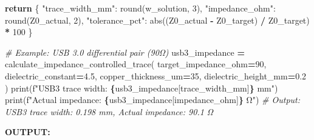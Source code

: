 \documentclass[
]{article}
\newenvironment{Shaded}{\begin{snugshade}}{\end{snugshade}}
\newcommand{\BuiltInTok}[1]{#1}
\newcommand{\CommentTok}[1]{\textcolor[rgb]{0.56,0.35,0.01}{\textit{#1}}}
\newcommand{\ControlFlowTok}[1]{\textcolor[rgb]{0.13,0.29,0.53}{\textbf{#1}}}
\newcommand{\DecValTok}[1]{\textcolor[rgb]{0.00,0.00,0.81}{#1}}
\newcommand{\FloatTok}[1]{\textcolor[rgb]{0.00,0.00,0.81}{#1}}
\newcommand{\NormalTok}[1]{#1}
\newcommand{\OperatorTok}[1]{\textcolor[rgb]{0.81,0.36,0.00}{\textbf{#1}}}
\newcommand{\SpecialCharTok}[1]{\textcolor[rgb]{0.81,0.36,0.00}{\textbf{#1}}}
\newcommand{\SpecialStringTok}[1]{\textcolor[rgb]{0.31,0.60,0.02}{#1}}
\newcommand{\StringTok}[1]{\textcolor[rgb]{0.31,0.60,0.02}{#1}}
\begin{document}
\begin{Shaded}
\begin{Highlighting}[]
    \ControlFlowTok{return}\NormalTok{ \{}
        \StringTok{"trace\_width\_mm"}\NormalTok{: }\BuiltInTok{round}\NormalTok{(w\_solution, }\DecValTok{3}\NormalTok{),}
        \StringTok{"impedance\_ohm"}\NormalTok{: }\BuiltInTok{round}\NormalTok{(Z0\_actual, }\DecValTok{2}\NormalTok{),}
        \StringTok{"tolerance\_pct"}\NormalTok{: }\BuiltInTok{abs}\NormalTok{((Z0\_actual }\OperatorTok{{-}}\NormalTok{ Z0\_target) }\OperatorTok{/}\NormalTok{ Z0\_target) }\OperatorTok{*} \DecValTok{100}
\NormalTok{    \}}

\CommentTok{\# Example: USB 3.0 differential pair (90Ω)}
\NormalTok{usb3\_impedance }\OperatorTok{=}\NormalTok{ calculate\_impedance\_controlled\_trace(}
\NormalTok{    target\_impedance\_ohm}\OperatorTok{=}\DecValTok{90}\NormalTok{,}
\NormalTok{    dielectric\_constant}\OperatorTok{=}\FloatTok{4.5}\NormalTok{,}
\NormalTok{    copper\_thickness\_um}\OperatorTok{=}\DecValTok{35}\NormalTok{,}
\NormalTok{    dielectric\_height\_mm}\OperatorTok{=}\FloatTok{0.2}
\NormalTok{)}
\BuiltInTok{print}\NormalTok{(}\SpecialStringTok{f"USB3 trace width: }\SpecialCharTok{\{}\NormalTok{usb3\_impedance[}\StringTok{\textquotesingle{}trace\_width\_mm\textquotesingle{}}\NormalTok{]}\SpecialCharTok{\}}\SpecialStringTok{ mm"}\NormalTok{)}
\BuiltInTok{print}\NormalTok{(}\SpecialStringTok{f"Actual impedance: }\SpecialCharTok{\{}\NormalTok{usb3\_impedance[}\StringTok{\textquotesingle{}impedance\_ohm\textquotesingle{}}\NormalTok{]}\SpecialCharTok{\}}\SpecialStringTok{ Ω"}\NormalTok{)}
\CommentTok{\# Output: USB3 trace width: 0.198 mm, Actual impedance: 90.1 Ω}
\end{Highlighting}
\end{Shaded}

\textbf{OUTPUT:}
\end{document}

